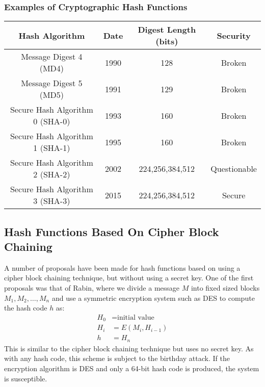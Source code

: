 \documentclass{math}
\begin{document}
\subsubsection*{Examples of Cryptographic Hash Functions}
\begin{center}
  \begin{tabular}{|c|c|c|c|}
    \hline
    Hash Algorithm & Date & Digest Length (bits) & Security \\
    \hline
    Message Digest 4 (MD4) & 1990 & 128 & Broken \\
    \hline
    Message Digest 5 (MD5) & 1991 & 129 & Broken \\
    \hline
    Secure Hash Algorithm 0 (SHA-0) & 1993 & 160 & Broken \\
    \hline
    Secure Hash Algorithm 1 (SHA-1) & 1995 & 160 & Broken \\
    \hline
    Secure Hash Algorithm 2 (SHA-2) & 2002 & 224,256,384,512 & Questionable \\
    \hline
    Secure Hash Algorithm 3 (SHA-3) & 2015 & 224,256,384,512 & Secure \\
    \hline
  \end{tabular}
\end{center}

\subsection*{Hash Functions Based On Cipher Block Chaining}
A number of proposals have been made for hash functions based on using a
cipher block chaining technique, but without using a secret key. One of the
first proposals was that of Rabin, where we divide a message \( M \) into fixed
sized blocks \( M_1,M_2,\dots,M_n \) and use a symmetric encryption system such
as DES to compute the hash code \( h \) as:
\begin{align*}
  H_0 &= \text{initial value} \\
  H_i &= E(M_i,H_{i-1}) \\
  h &= H_n
\end{align*}
This is similar to the cipher block chaining technique but uses no secret key.
As with any hash code, this scheme is subject to the birthday attack. If the
encryption algorithm is DES and only a 64-bit hash code is produced, the
system is susceptible.
\end{document}
